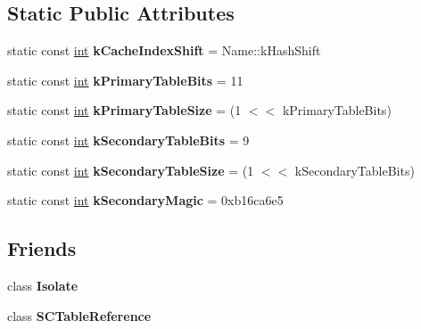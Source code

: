 \subsection*{Static Public Attributes}
\begin{DoxyCompactItemize}
\item 
\mbox{\label{classv8_1_1internal_1_1StubCache_a07d471a2ba3f66c34c0dce09cb11bee8}} 
static const \mbox{\hyperlink{classint}{int}} {\bfseries k\+Cache\+Index\+Shift} = Name\+::k\+Hash\+Shift
\item 
\mbox{\label{classv8_1_1internal_1_1StubCache_a227170c5270d6466a4f116206a12f879}} 
static const \mbox{\hyperlink{classint}{int}} {\bfseries k\+Primary\+Table\+Bits} = 11
\item 
\mbox{\label{classv8_1_1internal_1_1StubCache_aadaf0bfada4516c5918921ed05bdfb74}} 
static const \mbox{\hyperlink{classint}{int}} {\bfseries k\+Primary\+Table\+Size} = (1 $<$$<$ k\+Primary\+Table\+Bits)
\item 
\mbox{\label{classv8_1_1internal_1_1StubCache_a38beaddc959a149be39c0945b839c696}} 
static const \mbox{\hyperlink{classint}{int}} {\bfseries k\+Secondary\+Table\+Bits} = 9
\item 
\mbox{\label{classv8_1_1internal_1_1StubCache_a9166b165aa5c1debb4c3d83923948df8}} 
static const \mbox{\hyperlink{classint}{int}} {\bfseries k\+Secondary\+Table\+Size} = (1 $<$$<$ k\+Secondary\+Table\+Bits)
\item 
\mbox{\label{classv8_1_1internal_1_1StubCache_a46c6d3776aedbb61c9816a0d2ba439b9}} 
static const \mbox{\hyperlink{classint}{int}} {\bfseries k\+Secondary\+Magic} = 0xb16ca6e5
\end{DoxyCompactItemize}
\subsection*{Friends}
\begin{DoxyCompactItemize}
\item 
\mbox{\label{classv8_1_1internal_1_1StubCache_aba4f0964bdacf2bbf62cf876e5d28d0a}} 
class {\bfseries Isolate}
\item 
\mbox{\label{classv8_1_1internal_1_1StubCache_ad842275e288fccee190c3166f1bc3eed}} 
class {\bfseries S\+C\+Table\+Reference}
\end{DoxyCompactItemize}



